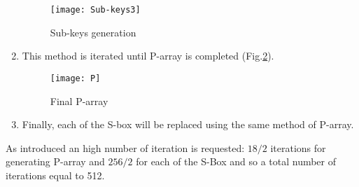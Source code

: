 \begin{enumerate}
\begin{figure}[!h]
 \begin{center}
 \texttt{[image: Sub-keys3]}
 \caption{Sub-keys generation}
 \label{Fig:Sub_keys3}
 \end{center}
 \end{figure}
 
 \item This method is iterated until P-array is completed (Fig.\ref{Fig:P}).
 \begin{figure}[!h]
 \centering
 \texttt{[image: P]}
 \caption{Final P-array}
 \label{Fig:P}
 \end{figure}
 \item Finally, each of the S-box will be replaced using the same method of P-array.
\end{enumerate}
As introduced an high number of iteration is requested: $18/2$ iterations for generating P-array and $256/2$ for each of the S-Box and so a total number of iterations equal to 512.